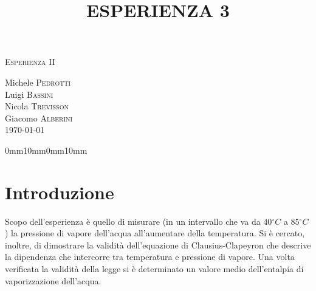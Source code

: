 \documentclass[11pt]{article}
\begin{document}
\begin{center}



\textsc{\Huge Esperienza II}\\[0.5cm]



\large
\title{ESPERIENZA 3}

Michele \textsc{Pedrotti}\\
Luigi \textsc{Bassini}\\
Nicola \textsc{Trevisson}\\
Giacomo \textsc{Alberini}
\\
\vspace{10pt}
\today





\end{center}

\setmarginsrb{30mm}{10mm}{25mm}{10mm}%
             {0mm}{10mm}{0mm}{10mm}


\section{Introduzione}
Scopo dell'esperienza è quello di misurare (in un intervallo che va da $40\ensuremath{^\circ}C$ a $85\ensuremath{^\circ}C$) la pressione di vapore dell'acqua all'aumentare della temperatura. Si è cercato, inoltre, di dimostrare la validità dell'equazione di Clausius-Clapeyron che descrive la dipendenza che intercorre tra temperatura e pressione di vapore.
Una volta verificata la validità della legge si è determinato un valore medio dell'entalpia di vaporizzazione dell'acqua.
\end{document}
